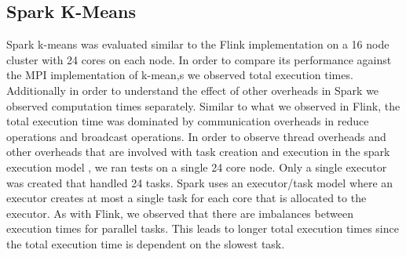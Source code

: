\documentclass[10pt, conference, compsocconf]{IEEEtran}
\begin{document}
\subsection{Spark K-Means}
Spark k-means was evaluated similar to the Flink implementation on a 16 node cluster with 24 cores on each node. In order to compare its performance against the MPI implementation of k-mean,s we observed total execution times. Additionally in order to understand the effect of other overheads in Spark we observed computation times separately. Similar to what we observed in Flink, the total execution time was dominated by communication overheads in reduce operations and broadcast operations. 
In order to observe thread overheads and other overheads that are involved with task creation and execution in the spark execution model , we ran tests on a single 24 core node. Only a single executor was created that handled 24 tasks. Spark uses an executor/task model where an executor creates at most a single task for each core that is allocated to the executor. As with Flink, we observed that there are imbalances between execution times for parallel tasks. This leads to longer total execution times since the total execution time is dependent on the slowest task. 
\end{document}
